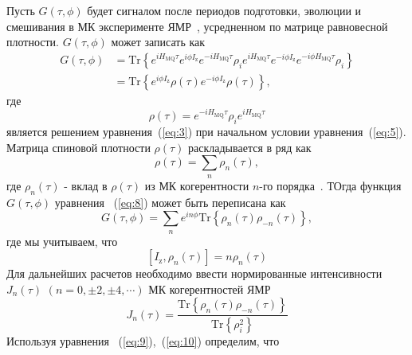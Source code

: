 \documentclass[review]{elsarticle}
\begin{document}
Пусть $G(\tau,\phi)$ будет сигналом после периодов подготовки, эволюции и смешивания в МК эксперименте ЯМР~\cite{Baum_1985}, усредненном по матрице равновесной плотности. $G(\tau,\phi)$ может записать как~\cite{Doronin_2019} 
%
\begin{equation}
    \begin{split}
        \label{eq:8}
        G(\tau,\phi) 
        & = \mathrm{Tr}\left\{
            e^{i H_\mathrm{MQ} \tau} e^{i\phi I_\mathrm{z}} e^{-i H_\mathrm{MQ}\tau} 
            \rho_i 
            e^{i H_\mathrm{MQ} \tau} e^{-i \phi I_\mathrm{z}} e^{-i \phi H_\mathrm{MQ} \tau} 
            \rho_i 
        \right\} \\
        & = \mathrm{Tr} \left\{
        e^{i \phi I_\mathrm{z}}
        \rho(\tau) 
        e^{-i \phi I_\mathrm{z}} 
        \rho(\tau) 
        \right\},
    \end{split}
\end{equation}
%
где
%
\begin{equation}
    \label{eq:9}
    \rho(\tau) 
    = e^{-i H_\mathrm{MQ} \tau } 
    \rho_i 
    e^{i H_\mathrm{MQ} \tau}
\end{equation}
%
является решением уравнения~(\ref{eq:3}) при начальном условии уравнения~(\ref{eq:5}).
Матрица спиновой плотности $\rho(\tau)$ раскладывается в ряд как
%
\begin{equation}
    \label{eq:10}
    \rho(\tau) = \sum\limits_n \rho_n(\tau),
\end{equation}
%
где $\rho_{n}(\tau)$ - вклад в $\rho(\tau)$ из МК когерентности $n$-го порядка~\cite{Fel_dman_1996}.
ТОгда функция $G(\tau,\phi)$ уравнения ~(\ref{eq:8}) может быть переписана как
%
\begin{equation}
    \label{eq:11}
    G(\tau,\phi) 
    = \sum\limits_n e^{i n \phi} \mathrm{Tr} \left\{ 
        \rho_{n}(\tau) \rho_{-n}(\tau) 
    \right\},
\end{equation}
%
где мы учитываем, что
%
\begin{equation}
    \label{eq:12}
    \left[ I_{\mathrm{z}},\rho_n(\tau) \right] = n \rho_n(\tau)
\end{equation}
%
Для дальнейших расчетов необходимо ввести нормированные интенсивности $J_{n}(\tau)$ $(n=0, \pm 2, \pm 4, \cdots)$ МК когерентностей ЯМР
%
\begin{equation}
    \label{eq:13}
    J_{n}(\tau) = \dfrac{\mathrm{Tr} \left\{
    \rho_{n}(\tau) \rho_{-n}(\tau) 
    \right\}} 
    {\mathrm{Tr} \left\{\rho^2_{i} \right\}}
\end{equation}
%
Используя уравнения ~(\ref{eq:9}),~(\ref{eq:10}) определим, что
\end{document}
